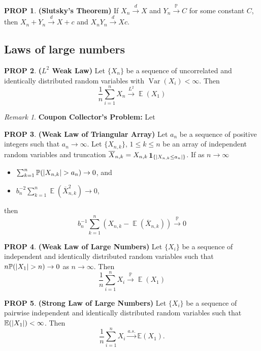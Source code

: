 \documentclass[hidelinks,11pt]{article}
\theoremstyle{definition}
\theoremstyle{dotless}
\newtheorem{prop}{PROP}[section]
\theoremstyle{remark}
\newtheorem*{remark}{Remark}
\DeclareMathOperator{\Var}{Var}
\DeclareMathOperator{\E}{\mathbb{E}}
\DeclareMathOperator{\1}{\mathbf{1}}
\begin{document}
\begin{prop}\textup{\textbf{(Slutsky's Theorem) }}If $X_n\xrightarrow{d}X$ and $Y_n\xrightarrow{\mathbb{P}}C$ for some constant $C$, then $X_n+Y_n\xrightarrow{d}X+c$ and $X_nY_n\xrightarrow{d}Xc$.
\end{prop}

\subsection{Laws of large numbers}

\begin{prop}\textup{\textbf{($L^2$ Weak Law) }}Let $\{X_n\}$ be a sequence of uncorrelated and identically distributed random variables with $\Var(X_i)<\infty$. Then
\[\frac{1}{n}\sum_{i=1}^nX_n\xrightarrow{L^2}\E(X_1)\]
\end{prop}

\begin{remark}\textup{\textbf{Coupon Collector's Problem:}} Let
\end{remark}

\begin{prop}\textup{\textbf{(Weak Law of Triangular Array) }}Let $a_n$ be a sequence of positive integers such that $a_n\to\infty$. Let $\{X_{n,k}\}$, $1\leq k\leq n$ be an array of independent random variables and truncation $\overline{X}_{n,k}=X_{n,k}\1_{\{\abs{X_{n,k}\leq a_n}\}}$. If as $n\to\infty$\begin{itemize}
    \item $\sum_{k=1}^n\mathbb{P}(\abs{X_{n,k}}>a_n)\to0$, and
    \item $b_n^{-2}\sum_{k=1}^n\E(\overline{X}_{n,k}^2)\to0$,
\end{itemize}
then
\[b_n^{-1}\sum_{k=1}^n(X_{n,k}-\E(\overline{X}_{n,k}))\xrightarrow{\mathbb{P}}0\]
\end{prop}

\begin{prop}\textup{\textbf{(Weak Law of Large Numbers) }}Let $\{X_i\}$ be a sequence of independent and identically distributed random variables such that $n\mathbb{P}(\abs{X_1}>n)\to0$ as $n\to\infty$. Then
\[\frac{1}{n}\sum_{i=1}^n X_i\xrightarrow{\mathbb{P}}\E(X_1)\]
\end{prop}

\begin{prop}\textup{\textbf{(Strong Law of Large Numbers) }}Let $\{X_i\}$ be a sequence of pairwise independent and identically distributed random variables such that $\mathbb{E}(\abs{X_1})<\infty$. Then
\[\frac{1}{n}\sum_{i=1}^nX_i\xrightarrow{a.s.}\mathbb{E}(X_1).\]
\end{prop}
\end{document}
